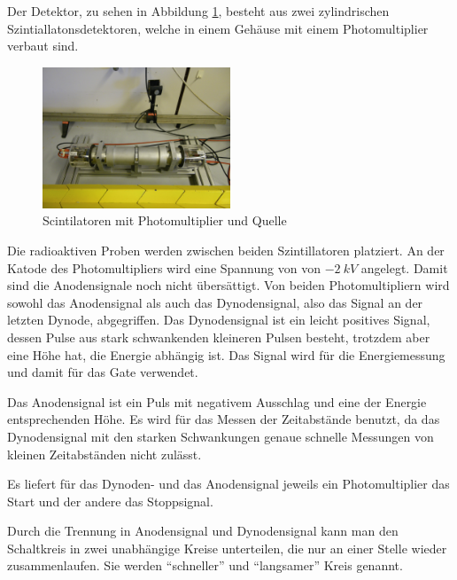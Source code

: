 \documentclass[a4paper,12pt]{article}
\begin{document}
Der Detektor, zu sehen in Abbildung \ref{fig:quelle},  besteht aus zwei zylindrischen Szintiallatonsdetektoren,
welche in einem Gehäuse mit einem Photomultiplier verbaut sind.
\begin{figure}[htb]
		\centering
		\includegraphics[width=0.5\textwidth]{quelle2.jpg}
		\caption{Scintilatoren mit Photomultiplier und Quelle}
		\label{fig:quelle}
\end{figure}

Die radioaktiven Proben werden zwischen beiden Szintillatoren platziert.
An der Katode des Photomultipliers wird  eine Spannung von von $\SI{-2}{kV}$ angelegt.
Damit sind die Anodensignale noch nicht übersättigt.
Von beiden Photomultipliern wird sowohl das Anodensignal als auch das Dynodensignal, also das Signal an der letzten Dynode, abgegriffen.
Das Dynodensignal ist ein leicht positives Signal, dessen Pulse aus stark schwankenden kleineren Pulsen besteht, trotzdem aber eine Höhe hat, die Energie abhängig ist.
Das Signal wird für die Energiemessung und damit für das Gate verwendet.

Das Anodensignal ist ein Puls mit negativem Ausschlag und eine der Energie entsprechenden Höhe.
Es wird für das Messen der Zeitabstände benutzt, da das Dynodensignal mit den starken Schwankungen genaue schnelle Messungen von kleinen Zeitabständen nicht zulässt.

Es liefert für das Dynoden- und das Anodensignal jeweils ein Photomultiplier das Start und der andere das Stoppsignal.

Durch die Trennung in Anodensignal und Dynodensignal kann man den Schaltkreis in zwei unabhängige Kreise unterteilen, die nur an einer Stelle wieder zusammenlaufen.
Sie werden "`schneller"' und "`langsamer"' Kreis genannt.
\end{document}
